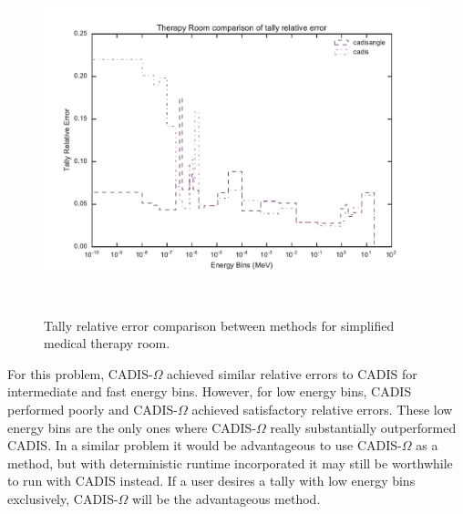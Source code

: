 \begin{figure}[h!]
  \centering
  \includegraphics[height=10cm]{./chapters/characterization_probs/figures/char/therapy/therapy_room_tally_error_compare.pdf}
  \caption[Tally relative error comparison between methods for simplified
  medical therapy room.]
  {Tally relative error comparison between methods for simplified medical
  therapy room.}
  \label{fig:therapyerror}
\end{figure}

For this problem, CADIS-$\Omega$ achieved similar relative errors to CADIS for
intermediate and fast energy bins. However, for low energy bins, CADIS
performed poorly and CADIS-$\Omega$ achieved satisfactory relative errors. These
low energy bins are the only ones where CADIS-$\Omega$ really substantially
outperformed CADIS. In a similar problem it would be advantageous to use
CADIS-$\Omega$ as a method, but with deterministic runtime incorporated it may
still be worthwhile to run with CADIS instead. If a user desires a tally with
low energy bins exclusively, CADIS-$\Omega$ will be the advantageous method.

